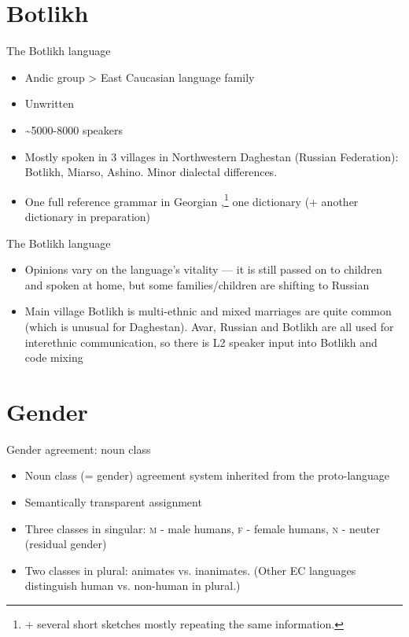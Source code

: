 



\begin{frame}
\titlepage

\end{frame}

\section{Botlikh}
\begin{frame}{The Botlikh language}

\begin{itemize}
    \item Andic group > East Caucasian language family
    \item Unwritten
    \item \textasciitilde{}5000-8000 speakers
    \item Mostly spoken in 3 villages in Northwestern Daghestan (Russian Federation): Botlikh, Miarso, Ashino. Minor dialectal differences.
    \item One full reference grammar in Georgian  \citep{gudava1962},\footnote{\footnotesize{+ several short sketches mostly repeating the same information.}} one dictionary \citep{saidovaabusov2012} (+ another dictionary in preparation)
\end{itemize}

\end{frame}

\begin{frame}{The Botlikh language}
\begin{itemize}
    \item Opinions vary on the language's vitality --- it is still passed on to children and spoken at home, but some families/children are shifting to Russian
    \item Main village Botlikh is multi-ethnic and mixed marriages are quite common (which is unusual for Daghestan). Avar, Russian and Botlikh are all used for interethnic communication, so there is L2 speaker input into Botlikh and code mixing
\end{itemize}
    
\end{frame}

\section{Gender}
\begin{frame}{Gender agreement: noun class}

\begin{itemize}
    \item Noun class (= gender) agreement system inherited from the proto-language
    \item Semantically transparent assignment
    \item Three classes in singular: \textsc{m} - male humans, \textsc{f} - female humans, \textsc{n} - neuter (residual gender)
    \item Two classes in plural: animates vs. inanimates. (Other EC languages distinguish human vs. non-human in plural.)
\end{itemize}
\end{frame}

